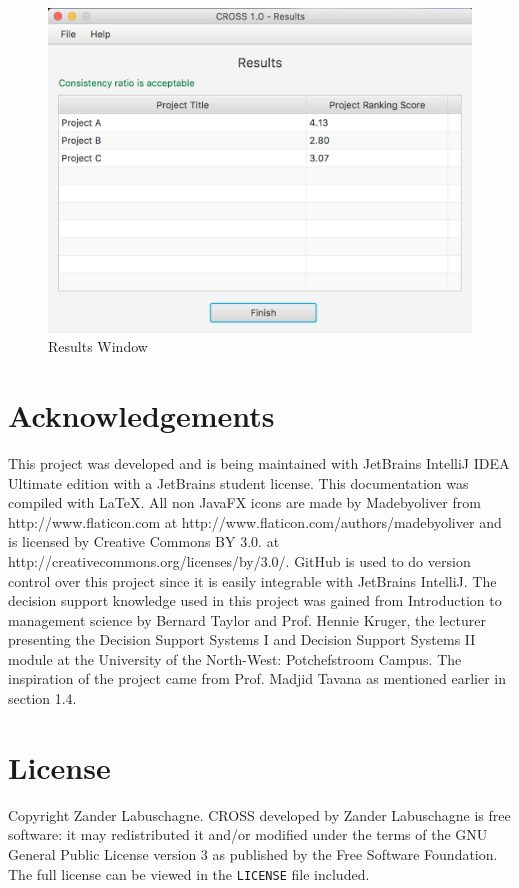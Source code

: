 \documentclass[11pt]{article}
\newcommand{\code}[1]{\texttt{#1}}
\begin{document}
		\begin{figure}[!htb]
			\centering
			\includegraphics[scale=0.55]{results}
			\caption{Results Window} %
			\label{fig:results} %
		\end{figure}

	\newpage


	\section{Acknowledgements}
		This project was developed and is being maintained with JetBrains IntelliJ IDEA Ultimate edition with a JetBrains student license. This documentation was compiled with \LaTeX. All non JavaFX icons are made by Madebyoliver from http://www.flaticon.com at http://www.flaticon.com/authors/madebyoliver and is licensed by Creative Commons BY 3.0. at http://creativecommons.org/licenses/by/3.0/. GitHub is used to do version control over this project since it is easily integrable with JetBrains IntelliJ. The decision support knowledge used in this project was gained from Introduction to management science by Bernard Taylor \cite{taylor2004introduction} and Prof. Hennie Kruger, the lecturer presenting the Decision Support Systems I and Decision Support Systems II module at the University of the North-West: Potchefstroom Campus. The inspiration of the project came from Prof. Madjid Tavana as mentioned earlier in section 1.4.
		
	\newpage

	\section{License}
		Copyright \textcopyright {} Zander Labuschagne. CROSS developed by Zander Labuschagne is free software: it may redistributed it and/or modified under the terms of the GNU General Public License version 3 as published by the Free Software Foundation. The full license can be viewed in the \code{LICENSE} file included.
\end{document}

